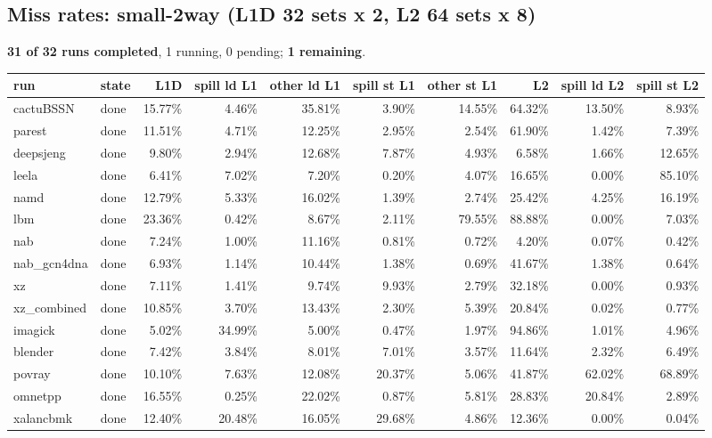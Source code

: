 \documentclass[10pt,a4paper,landscape]{article}
\begin{document}
\subsection*{Miss rates: small-2way (L1D 32 sets x 2, L2 64 sets x 8)}
\textbf{31 of 32 runs completed}, 1 running, 0 pending; \textbf{1 remaining}.\par
{\footnotesize
\begin{longtable}{llrrrrrrrr}
\toprule
run & state & L1D & spill ld L1 & other ld L1 & spill st L1 & other st L1 & L2 & spill ld L2 & spill st L2 \\
\midrule
\endhead
\bottomrule
\endfoot
cactuBSSN & done & 15.77\% & 4.46\% & 35.81\% & 3.90\% & 14.55\% & 64.32\% & 13.50\% & 8.93\% \\
parest & done & 11.51\% & 4.71\% & 12.25\% & 2.95\% & 2.54\% & 61.90\% & 1.42\% & 7.39\% \\
deepsjeng & done & 9.80\% & 2.94\% & 12.68\% & 7.87\% & 4.93\% & 6.58\% & 1.66\% & 12.65\% \\
leela & done & 6.41\% & 7.02\% & 7.20\% & 0.20\% & 4.07\% & 16.65\% & 0.00\% & 85.10\% \\
namd & done & 12.79\% & 5.33\% & 16.02\% & 1.39\% & 2.74\% & 25.42\% & 4.25\% & 16.19\% \\
lbm & done & 23.36\% & 0.42\% & 8.67\% & 2.11\% & 79.55\% & 88.88\% & 0.00\% & 7.03\% \\
nab & done & 7.24\% & 1.00\% & 11.16\% & 0.81\% & 0.72\% & 4.20\% & 0.07\% & 0.42\% \\
nab\_gcn4dna & done & 6.93\% & 1.14\% & 10.44\% & 1.38\% & 0.69\% & 41.67\% & 1.38\% & 0.64\% \\
xz & done & 7.11\% & 1.41\% & 9.74\% & 9.93\% & 2.79\% & 32.18\% & 0.00\% & 0.93\% \\
xz\_combined & done & 10.85\% & 3.70\% & 13.43\% & 2.30\% & 5.39\% & 20.84\% & 0.02\% & 0.77\% \\
imagick & done & 5.02\% & 34.99\% & 5.00\% & 0.47\% & 1.97\% & 94.86\% & 1.01\% & 4.96\% \\
blender & done & 7.42\% & 3.84\% & 8.01\% & 7.01\% & 3.57\% & 11.64\% & 2.32\% & 6.49\% \\
povray & done & 10.10\% & 7.63\% & 12.08\% & 20.37\% & 5.06\% & 41.87\% & 62.02\% & 68.89\% \\
omnetpp & done & 16.55\% & 0.25\% & 22.02\% & 0.87\% & 5.81\% & 28.83\% & 20.84\% & 2.89\% \\
xalancbmk & done & 12.40\% & 20.48\% & 16.05\% & 29.68\% & 4.86\% & 12.36\% & 0.00\% & 0.04\% \\

\end{longtable}}
\end{document}
